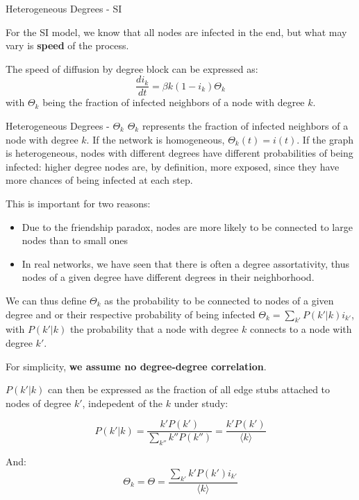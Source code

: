 \documentclass[a4paper,11pt]{book}
\begin{document}
\begin{textbox}{Heterogeneous Degrees - SI}


For the SI model, we know that all nodes are infected in the end, but what may vary is \textbf{speed} of the process.

The speed of diffusion by degree block can be expressed as:
\[
\frac{di_k}{dt}= \beta k(1-i_k) \Theta_k
\]
with $\Theta_k$ being the fraction of infected neighbors of a node with degree $k$.

\end{textbox}


\begin{textbox}{Heterogeneous Degrees - $\Theta_k$}
$\Theta_k$ represents the fraction of infected neighbors of a node with degree $k$. If the network is homogeneous, $\Theta_k(t)=i(t)$. If the graph is heterogeneous, nodes with different degrees have different probabilities of being infected: higher degree nodes are, by definition, more exposed, since they have more chances of being infected at each step. 

This is important for two reasons:
\begin{itemize}
    \item Due to the friendship paradox, nodes are more likely to be connected to large nodes than to small ones
    \item In real networks, we have seen that there is often a degree assortativity, thus nodes of a given degree have different degrees in their neighborhood.
\end{itemize}

We can thus define $\Theta_k$ as the probability to be connected to nodes of a given degree and or their respective probability of being infected $\Theta_k=\sum_{k'}P(k'|k)i_{k'}$, with $P(k'|k)$ the probability that a node with degree $k$ connects to a node with degree $k'$.

For simplicity, \textbf{we assume no degree-degree correlation}.

$P(k'|k)$ can then be expressed as the fraction of all edge stubs attached to nodes of degree $k'$, indepedent of the $k$ under study:

\[
P(k'|k)=\frac{k'P(k')}{\sum_{k''}k''P(k'')}=\frac{k'P(k')}{\langle k \rangle}
\]

And: 
\[
\Theta_k=\Theta= \frac{\sum_{k'}k' P(k')i_{k'}}{\langle k \rangle}
\]


\end{textbox}
\end{document}
